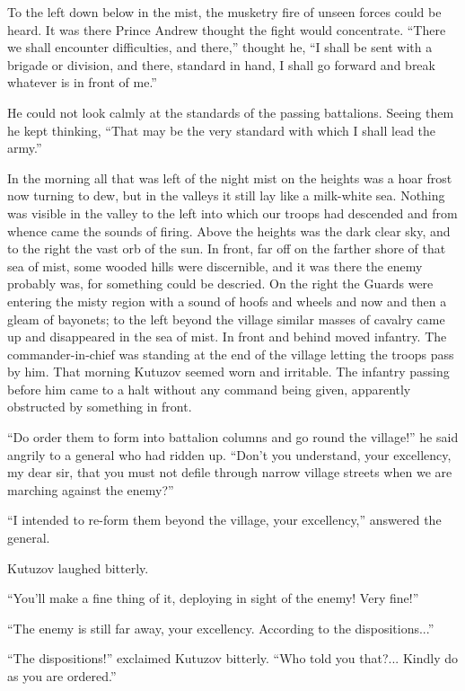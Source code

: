 To the left down below in the mist, the musketry fire of unseen
forces could be heard. It was there Prince Andrew thought the
fight would concentrate. ``There we shall encounter difficulties,
and there,'' thought he, ``I shall be sent with a brigade or
division, and there, standard in hand, I shall go forward and
break whatever is in front of me.''

He could not look calmly at the standards of the passing
battalions.  Seeing them he kept thinking, ``That may be the very
standard with which I shall lead the army.''

In the morning all that was left of the night mist on the heights
was a hoar frost now turning to dew, but in the valleys it still
lay like a milk-white sea. Nothing was visible in the valley to
the left into which our troops had descended and from whence came
the sounds of firing.  Above the heights was the dark clear sky,
and to the right the vast orb of the sun. In front, far off on
the farther shore of that sea of mist, some wooded hills were
discernible, and it was there the enemy probably was, for
something could be descried. On the right the Guards were
entering the misty region with a sound of hoofs and wheels and
now and then a gleam of bayonets; to the left beyond the village
similar masses of cavalry came up and disappeared in the sea of
mist. In front and behind moved infantry. The commander-in-chief
was standing at the end of the village letting the troops pass by
him. That morning Kutuzov seemed worn and irritable. The infantry
passing before him came to a halt without any command being
given, apparently obstructed by something in front.

``Do order them to form into battalion columns and go round the
village!''  he said angrily to a general who had ridden
up. ``Don't you understand, your excellency, my dear sir, that
you must not defile through narrow village streets when we are
marching against the enemy?''

``I intended to re-form them beyond the village, your
excellency,'' answered the general.

Kutuzov laughed bitterly.

``You'll make a fine thing of it, deploying in sight of the
enemy! Very fine!''

``The enemy is still far away, your excellency. According to the
dispositions...''

``The dispositions!'' exclaimed Kutuzov bitterly. ``Who told you
that?...  Kindly do as you are ordered.''

